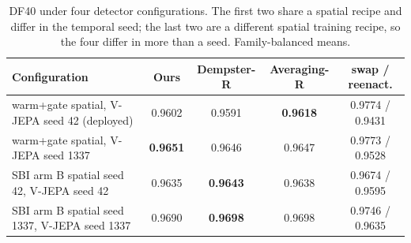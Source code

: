 \begin{table}[t]
\centering
\caption{DF40 under four detector configurations. The first two share a spatial recipe and differ in the temporal seed; the last two are a different spatial training recipe, so the four differ in more than a seed. Family-balanced means.}
\label{tab:configs}
\small
\begin{tabular}{lcccc}
\toprule
Configuration & \textbf{Ours} & Dempster-R & Averaging-R & swap / reenact. \\
\midrule
warm+gate spatial, V-JEPA seed 42 (deployed) & 0.9602 & 0.9591 & \textbf{0.9618} & 0.9774 / 0.9431 \\
warm+gate spatial, V-JEPA seed 1337 & \textbf{0.9651} & 0.9646 & 0.9647 & 0.9773 / 0.9528 \\
SBI arm B spatial seed 42, V-JEPA seed 42 & 0.9635 & \textbf{0.9643} & 0.9638 & 0.9674 / 0.9595 \\
SBI arm B spatial seed 1337, V-JEPA seed 1337 & 0.9690 & \textbf{0.9698} & 0.9698 & 0.9746 / 0.9635 \\
\bottomrule
\end{tabular}
\end{table}
